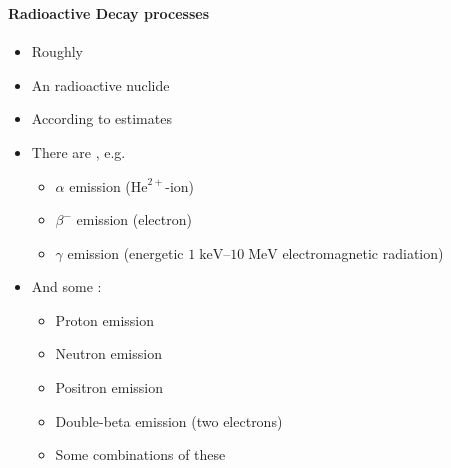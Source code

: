 \begin{frame}
\frametitle{\texorpdfstring{\culine[\sectiontitleulinecolor]{\sectiontitle}}{\sectiontitle} }
\framesubtitle{Radioactive Decay processes}

\semismall
\begin{itemize}
	\item Roughly  
	
	\item An  radioactive nuclide  
	\item According to estimates 
	
	\item There are , e.g.
\begin{itemize}
	\item $\alpha$ emission ($\mathrm{He}^{2+}$-ion)
	\item $\beta^{-}$ emission (electron)
	\item $\gamma$ emission (energetic $1 \mathrm{\;keV}–10 \mathrm{\;MeV}$ electromagnetic radiation)
\end{itemize}

\item[] And some :
\begin{itemize}
\item Proton emission
\item Neutron emission
\item Positron emission
\item Double-beta emission (two electrons)
\item Some combinations of these
\end{itemize}

\end{itemize}


\endofslide 
\end{frame}

